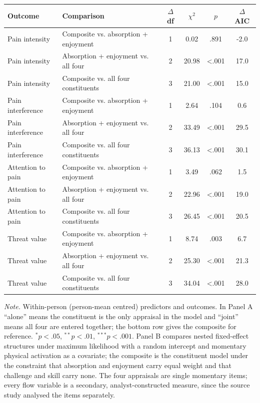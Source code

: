 \begin{table}[!htbp]
\begin{tabular*}{\textwidth}{@{\extracolsep{\fill}}llcccc@{}}
\toprule
Outcome & Comparison & $\Delta$ df & $\chi^2$ & $p$ & $\Delta$ AIC \\
\midrule
Pain intensity & Composite vs. absorption + enjoyment & 1 & 0.02 & .891 & -2.0 \\
Pain intensity & Absorption + enjoyment vs. all four & 2 & 20.98 & <.001 & 17.0 \\
Pain intensity & Composite vs. all four constituents & 3 & 21.00 & <.001 & 15.0 \\
Pain interference & Composite vs. absorption + enjoyment & 1 & 2.64 & .104 & 0.6 \\
Pain interference & Absorption + enjoyment vs. all four & 2 & 33.49 & <.001 & 29.5 \\
Pain interference & Composite vs. all four constituents & 3 & 36.13 & <.001 & 30.1 \\
Attention to pain & Composite vs. absorption + enjoyment & 1 & 3.49 & .062 & 1.5 \\
Attention to pain & Absorption + enjoyment vs. all four & 2 & 22.96 & <.001 & 19.0 \\
Attention to pain & Composite vs. all four constituents & 3 & 26.45 & <.001 & 20.5 \\
Threat value & Composite vs. absorption + enjoyment & 1 & 8.74 & .003 & 6.7 \\
Threat value & Absorption + enjoyment vs. all four & 2 & 25.30 & <.001 & 21.3 \\
Threat value & Composite vs. all four constituents & 3 & 34.04 & <.001 & 28.0 \\
\bottomrule
\end{tabular*}
\par\vspace{3pt}\noindent\parbox{\textwidth}{\footnotesize\textit{Note.} Within-person (person-mean centred) predictors and outcomes. In Panel A ``alone'' means the constituent is the only appraisal in the model and ``joint'' means all four are entered together; the bottom row gives the composite for reference. $^{*}p<.05$, $^{**}p<.01$, $^{***}p<.001$. Panel B compares nested fixed-effect structures under maximum likelihood with a random intercept and momentary physical activation as a covariate; the composite is the constituent model under the constraint that absorption and enjoyment carry equal weight and that challenge and skill carry none. The four appraisals are single momentary items; every flow variable is a secondary, analyst-constructed measure, since the source study analysed the items separately.}
\endgroup
\end{table}
